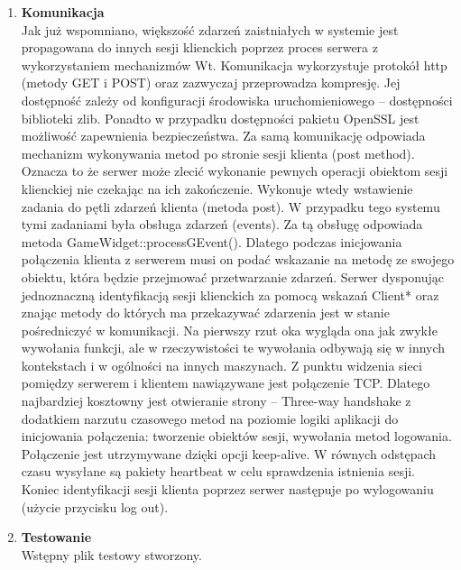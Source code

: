 \documentclass{report}
\begin{document}
\begin{enumerate}
\item \textbf{Komunikacja} \\
Jak już wspomniano, większość zdarzeń zaistniałych w systemie jest propagowana do innych sesji klienckich poprzez proces serwera z wykorzystaniem mechanizmów Wt. Komunikacja wykorzystuje protokół http (metody GET i POST) oraz zazwyczaj przeprowadza  kompresję. Jej dostępność zależy od konfiguracji środowiska uruchomieniowego – dostępności biblioteki zlib.
Ponadto w przypadku dostępności pakietu OpenSSL jest możliwość zapewnienia bezpieczeństwa.
Za samą komunikację odpowiada mechanizm wykonywania metod po stronie sesji klienta (post method). Oznacza to że serwer może zlecić wykonanie pewnych operacji obiektom sesji klienckiej nie czekając na ich zakończenie. Wykonuje wtedy wstawienie zadania do pętli zdarzeń klienta (metoda post). W przypadku tego systemu tymi zadaniami była obsługa zdarzeń (events). Za tą obsługę odpowiada metoda GameWidget::processGEvent().
Dlatego podczas inicjowania połączenia klienta z serwerem musi on podać wskazanie na metodę ze swojego obiektu, która będzie przejmować przetwarzanie zdarzeń. Serwer dysponując jednoznaczną identyfikacją sesji klienckich za pomocą wskazań Client* oraz znając metody do których ma przekazywać zdarzenia jest w stanie pośredniczyć w komunikacji. Na pierwszy rzut oka wygląda ona jak zwykłe wywołania funkcji, ale w rzeczywistości te wywołania odbywają się w innych kontekstach i w ogólności na innych maszynach.
Z punktu widzenia sieci pomiędzy serwerem i klientem nawiązywane jest połączenie TCP. Dlatego najbardziej kosztowny jest otwieranie strony – Three-way handshake z dodatkiem narzutu czasowego metod na poziomie logiki aplikacji do inicjowania połączenia: tworzenie obiektów sesji, wywołania metod logowania. Połączenie jest utrzymywane dzięki opcji keep-alive. W równych odstępach czasu wysyłane są pakiety heartbeat w celu sprawdzenia istnienia sesji.
Koniec identyfikacji sesji klienta poprzez serwer następuje po wylogowaniu (użycie przycisku log out).

\item \textbf{Testowanie} \\
Wstępny plik testowy stworzony.
\end{enumerate}
\end{document}
